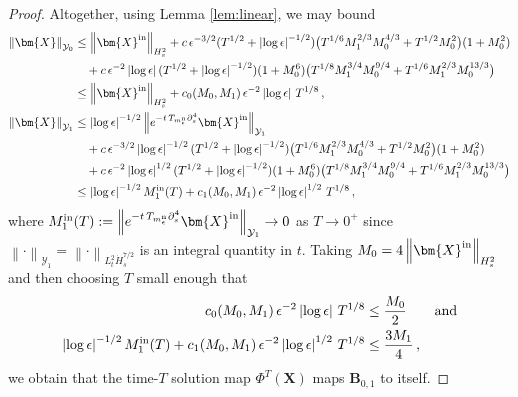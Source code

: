 \documentclass[11pt,reqno]{amsart}
\newcommand{\X}{\bm{X}}
\newcommand{\p}{\partial}
\newcommand{\abs}[1]{\left\lvert #1 \right\rvert}
\newcommand{\norm}[1]{\left\lVert #1 \right\rVert}
\newcommand{\mc}[1]{\mathcal{#1}}
\numberwithin{equation}{section}
\theoremstyle{definition}
\begin{document}
\begin{proof}
Altogether, using Lemma \ref{lem:linear}, we may bound 
\begin{equation}
\begin{aligned}
  \norm{\X}_{\mc{Y}_0} &\le \norm{\X^{\rm in}}_{H^2_s} + c\,\epsilon^{-3/2}(T^{1/2}+\abs{\log\epsilon}^{-1/2})\big(T^{1/6}M_1^{2/3}M_0^{4/3} + T^{1/2}M_0^2 \big)(1+M_0^2)\\
  &\quad + c\,\epsilon^{-2}\abs{\log\epsilon}(T^{1/2}+\abs{\log\epsilon}^{-1/2})(1+M_0^6)\big(T^{1/8}M_1^{3/4}M_0^{9/4} + T^{1/6}M_1^{2/3}M_0^{13/3} \big) \\
  &\le \norm{\X^{\rm in}}_{H^2_s} + c_0(M_0,M_1)\,\epsilon^{-2}\abs{\log\epsilon}\,T^{1/8}\,,\\
  \norm{\X}_{\mc{Y}_1} &\le \abs{\log\epsilon}^{-1/2}\norm{e^{-t\,T_{m_\epsilon^{\rm n}}\p_s^4}\X^{\rm in}}_{\mc{Y}_1}\\
  &\quad  + c\,\epsilon^{-3/2}\abs{\log\epsilon}^{-1/2}(T^{1/2}+\abs{\log\epsilon}^{-1/2})\big(T^{1/6}M_1^{2/3}M_0^{4/3} + T^{1/2}M_0^2 \big)(1+M_0^2)\\
  &\quad + c\,\epsilon^{-2}\abs{\log\epsilon}^{1/2}(T^{1/2}+\abs{\log\epsilon}^{-1/2})(1+M_0^6)\big(T^{1/8}M_1^{3/4}M_0^{9/4} + T^{1/6}M_1^{2/3}M_0^{13/3} \big)\\
  &\le \abs{\log\epsilon}^{-1/2}M_1^{\rm in}(T) + c_1(M_0,M_1)\,\epsilon^{-2}\abs{\log\epsilon}^{1/2}\,T^{1/8} \,,
\end{aligned}
\end{equation}
where $M_1^{\rm in}(T):= \norm{e^{-t\,T_{m_\epsilon^{\rm n}}\p_s^4}\X^{\rm in}}_{\mc{Y}_1}\to 0$ as $T\to 0^+$ since $\norm{\cdot}_{\mc{Y}_1}=\norm{\cdot}_{L^2_t\dot H^{7/2}_s}$ is an integral quantity in $t$. 
%
%
Taking $M_0 = 4\norm{\X^{\rm in}}_{H^2_s}$ and then choosing $T$ small enough that  
\begin{equation}\label{eq:Tcond1}
\begin{aligned}
  c_0(M_0,M_1)\,\epsilon^{-2}\abs{\log\epsilon}\,T^{1/8}&\le \frac{M_0}{2}
  \qquad \text{and}\\ 
  \abs{\log\epsilon}^{-1/2}M_1^{\rm in}(T) + c_1(M_0,M_1)\,\epsilon^{-2}\abs{\log\epsilon}^{1/2}\,T^{1/8}&\le \frac{3M_1}{4}\,,
\end{aligned}
\end{equation}
we obtain that the time-$T$ solution map $\Phi^T(\X)$ maps $\bm{B}_{0,1}$ to itself. 





\end{proof}
\end{document}
